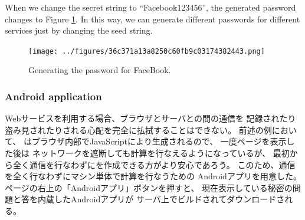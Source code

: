 \documentclass{article}
\begin{document}
When we change the secret string to ``\textsf{Facebook123456}'',
the generated password changes to Figure \ref{web2}.
In this way, we can generate different passwords for
different services just by changing the seed string.

\begin{figure}[H]
\centerline{\texttt{[image: ../figures/36c371a13a8250c60fb9c03174382443.png]}}
\caption{Generating the password for FaceBook.}
\label{web2}
\end{figure}




% 
% 


\subsubsection{Android application}

Webサービスを利用する場合、ブラウザとサーバとの間の通信を
記録されたり盗み見されたりされる心配を完全に払拭することはできない。
前述の例において、
{\PW}はブラウザ内部でJavaScriptにより生成されるので、
一度ページを表示した後は
ネットワークを遮断しても{\PW}計算を行なえるようになっているが、
最初から全く通信を行なわずに{\PW}を作成できる方がより安心であろう。
このため、通信を全く行なわずにマシン単体で{\PW}計算を行なうための
Androidアプリを用意した。
ページの右上の「Androidアプリ」ボタンを押すと、
現在表示している秘密の問題と答を内蔵したAndroidアプリが
サーバ上でビルドされてダウンロードされる。
\end{document}
